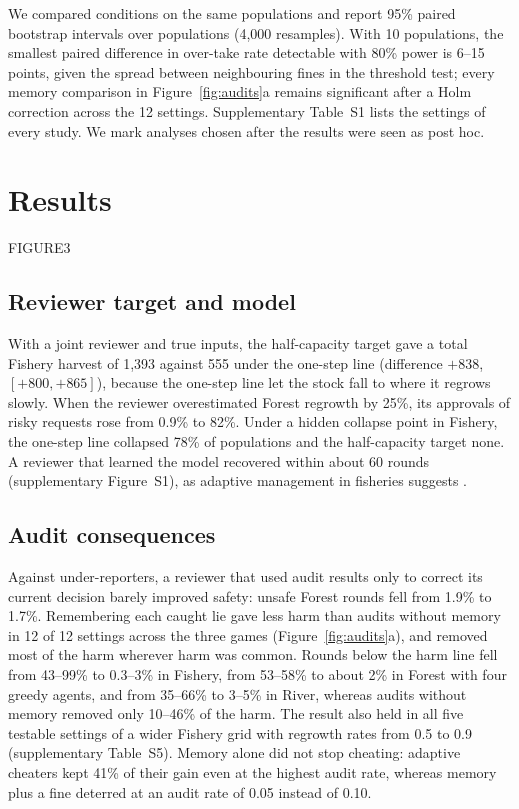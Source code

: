 We compared conditions on the same populations and report 95\% paired bootstrap intervals over populations (4{,}000 resamples). With 10 populations, the smallest paired difference in over-take rate detectable with 80\% power is 6--15 points, given the spread between neighbouring fines in the threshold test; every memory comparison in Figure~\ref{fig:audits}a remains significant after a Holm correction across the 12 settings. Supplementary Table~S1 lists the settings of every study. We mark analyses chosen after the results were seen as post hoc.

\section{Results}
\label{sec:results}

FIGURE3

\subsection{Reviewer target and model}

With a joint reviewer and true inputs, the half-capacity target gave a total Fishery harvest of 1{,}393 against 555 under the one-step line (difference $+838$, $[+800,+865]$), because the one-step line let the stock fall to where it regrows slowly. When the reviewer overestimated Forest regrowth by 25\%, its approvals of risky requests rose from 0.9\% to 82\%. Under a hidden collapse point in Fishery, the one-step line collapsed 78\% of populations and the half-capacity target none. A reviewer that learned the model recovered within about 60 rounds (supplementary Figure~S1), as adaptive management in fisheries suggests \citep{ludwig1993uncertainty}.


\subsection{Audit consequences}

Against under-reporters, a reviewer that used audit results only to correct its current decision barely improved safety: unsafe Forest rounds fell from 1.9\% to 1.7\%. Remembering each caught lie gave less harm than audits without memory in 12 of 12 settings across the three games (Figure~\ref{fig:audits}a), and removed most of the harm wherever harm was common. Rounds below the harm line fell from 43--99\% to 0.3--3\% in Fishery, from 53--58\% to about 2\% in Forest with four greedy agents, and from 35--66\% to 3--5\% in River, whereas audits without memory removed only 10--46\% of the harm. The result also held in all five testable settings of a wider Fishery grid with regrowth rates from 0.5 to 0.9 (supplementary Table~S5). Memory alone did not stop cheating: adaptive cheaters kept 41\% of their gain even at the highest audit rate, whereas memory plus a fine deterred at an audit rate of 0.05 instead of 0.10.

